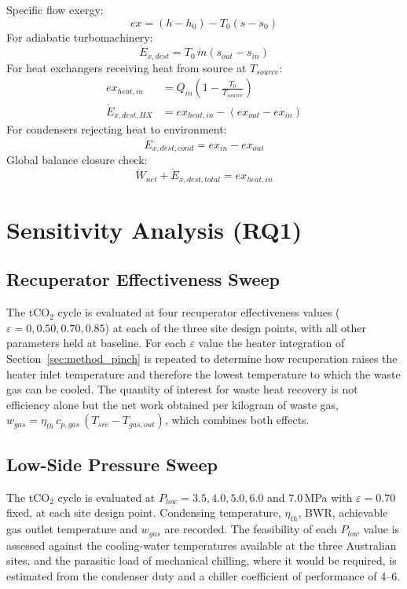Specific flow exergy:
\begin{equation}
ex = (h - h_0) - T_0(s - s_0)
\label{eq:flow_exergy}
\end{equation}
For adiabatic turbomachinery:
\begin{equation}
\dot{E}_{x,dest} = T_0\,\dot{m}(s_{out} - s_{in})
\label{eq:adiabatic_exdest}
\end{equation}
For heat exchangers receiving heat from source at $T_{source}$:
\begin{align}
ex_{heat,in} &= Q_{in}\!\left(1 - \frac{T_0}{T_{source}}\right) \label{eq:exergy_heat}\\
\dot{E}_{x,dest,HX} &= ex_{heat,in} - (ex_{out} - ex_{in}) \label{eq:hx_exdest}
\end{align}
For condensers rejecting heat to environment:
\begin{equation}
\dot{E}_{x,dest,cond} = ex_{in} - ex_{out}
\label{eq:cond_exdest}
\end{equation}
Global balance closure check:
\begin{equation}
\dot{W}_{net} + \dot{E}_{x,dest,total} = ex_{heat,in}
\label{eq:exergy_balance}
\end{equation}

\section{Sensitivity Analysis (RQ1)}
\label{sec:method_sensitivity}

\subsection{Recuperator Effectiveness Sweep}

The tCO$_2$ cycle is evaluated at four recuperator effectiveness values
($\varepsilon = 0, 0.50, 0.70, 0.85$) at each of the three site design
points, with all other parameters held at baseline. For each $\varepsilon$
value the heater integration of Section~\ref{sec:method_pinch} is repeated to
determine how recuperation raises the heater inlet temperature and therefore
the lowest temperature to which the waste gas can be cooled. The quantity of
interest for waste heat recovery is not efficiency alone but the net work
obtained per kilogram of waste gas, $w_{gas} = \eta_{th}\,c_{p,gas}\,
(T_{src} - T_{gas,out})$, which combines both effects.

\subsection{Low-Side Pressure Sweep}

The tCO$_2$ cycle is evaluated at $P_{low} = 3.5, 4.0, 5.0, 6.0$ and
$7.0$\,MPa with $\varepsilon = 0.70$ fixed, at each site design point.
Condensing temperature, $\eta_{th}$, BWR, achievable gas outlet temperature
and $w_{gas}$ are recorded. The feasibility of each $P_{low}$ value is assessed
against the cooling-water temperatures available at the three Australian
sites, and the parasitic load of mechanical chilling, where it would be
required, is estimated from the condenser duty and a chiller coefficient of
performance of 4--6.

